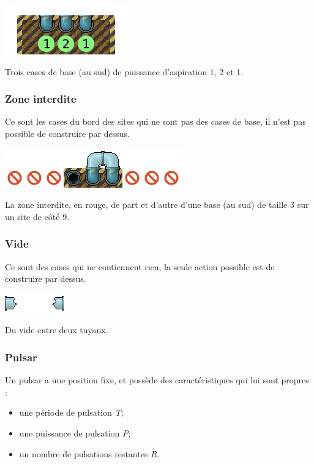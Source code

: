 \includegraphics{asset/base.png}

{Trois cases de base (au sud) de puissance d'aspiration 1, 2 et 1.}

\subsubsection{Zone interdite}\label{zone-interdite}

Ce sont les cases du bord des sites qui ne sont pas des cases de base,
il n'est pas possible de construire par dessus.

\includegraphics{asset/interdit.png}

{La zone interdite, en rouge, de part et d'autre d'une base (au sud) de taille 3 sur un site de côté 9.}

\subsubsection{Vide}\label{vide}

Ce sont des cases qui ne contiennent rien, la seule action possible est
de construire par dessus.

\includegraphics{asset/vide.png}

{Du vide entre deux tuyaux.}

\subsubsection{Pulsar}\label{pulsar}

Un pulsar a une position fixe, et possède des caractéristiques qui lui
sont propres :

\begin{itemize}
\tightlist
\item
  une période de pulsation \emph{T};
\item
  une puissance de pulsation \emph{P};
\item
  un nombre de pulsations restantes \emph{R}.
\end{itemize}

